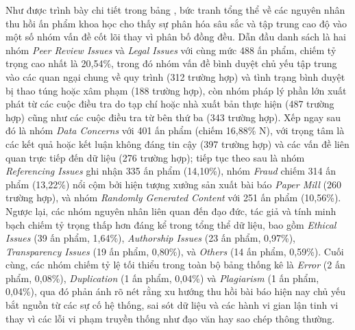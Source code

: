 Như được trình bày chi tiết trong bảng , bức tranh tổng thể về các nguyên nhân thu hồi ấn phẩm khoa học cho thấy sự phân hóa sâu sắc và tập trung cao độ vào một số nhóm vấn đề cốt lõi thay vì phân bố đồng đều. Dẫn đầu danh sách là hai nhóm \textit{Peer Review Issues} và \textit{Legal Issues} với cùng mức 488 ấn phẩm, chiếm tỷ trọng cao nhất là 20,54\%, trong đó nhóm vấn đề bình duyệt chủ yếu tập trung vào các quan ngại chung về quy trình (312 trường hợp) và tình trạng bình duyệt bị thao túng hoặc xâm phạm (188 trường hợp), còn nhóm pháp lý phần lớn xuất phát từ các cuộc điều tra do tạp chí hoặc nhà xuất bản thực hiện (487 trường hợp) cũng như các cuộc điều tra từ bên thứ ba (343 trường hợp). Xếp ngay sau đó là nhóm \textit{Data Concerns} với 401 ấn phẩm (chiếm 16,88\% N), với trọng tâm là các kết quả hoặc kết luận không đáng tin cậy (397 trường hợp) và các vấn đề liên quan trực tiếp đến dữ liệu (276 trường hợp); tiếp tục theo sau là nhóm \textit{Referencing Issues} ghi nhận 335 ấn phẩm (14,10\%), nhóm \textit{Fraud} chiếm 314 ấn phẩm (13,22\%) nổi cộm bởi hiện tượng xưởng sản xuất bài báo \textit{Paper Mill} (260 trường hợp), và nhóm \textit{Randomly Generated Content} với 251 ấn phẩm (10,56\%). Ngược lại, các nhóm nguyên nhân liên quan đến đạo đức, tác giả và tính minh bạch chiếm tỷ trọng thấp hơn đáng kể trong tổng thể dữ liệu, bao gồm \textit{Ethical Issues} (39 ấn phẩm, 1,64\%), \textit{Authorship Issues} (23 ấn phẩm, 0,97\%), \textit{Transparency Issues} (19 ấn phẩm, 0,80\%), và \textit{Others} (14 ấn phẩm, 0,59\%). Cuối cùng, các nhóm chiếm tỷ lệ tối thiểu trong toàn bộ bảng thống kê là \textit{Error} (2 ấn phẩm, 0,08\%), \textit{Duplication} (1 ấn phẩm, 0,04\%) và \textit{Plagiarism} (1 ấn phẩm, 0,04\%), qua đó phản ánh rõ nét rằng xu hướng thu hồi bài báo hiện nay chủ yếu bắt nguồn từ các sự cố hệ thống, sai sót dữ liệu và các hành vi gian lận tinh vi thay vì các lỗi vi phạm truyền thống như đạo văn hay sao chép thông thường.